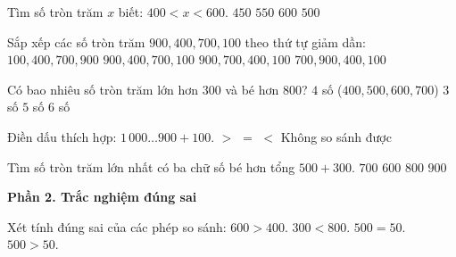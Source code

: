 \begin{ex} %
Tìm số tròn trăm $x$ biết: $400 < x < 600$.
\choice
{$450$}
{$550$}
{$600$}
{\True $500$}
\end{ex}

\begin{ex} %
Sắp xếp các số tròn trăm $900, 400, 700, 100$ theo thứ tự giảm dần:
\choice
{$100, 400, 700, 900$}
{$900, 400, 700, 100$}
{\True $900, 700, 400, 100$}
{$700, 900, 400, 100$}
\end{ex}

\begin{ex} %
Có bao nhiêu số tròn trăm lớn hơn 300 và bé hơn 800?
\choice
{\True $4$ số ($400, 500, 600, 700$)}
{$3$ số}
{$5$ số}
{$6$ số}
\end{ex}

\begin{ex} %
Điền dấu thích hợp: $1\,000 \dots 900 + 100$.
\choice
{$>$}
{\True $=$}
{$<$}
{Không so sánh được}
\end{ex}

\begin{ex} %
Tìm số tròn trăm lớn nhất có ba chữ số bé hơn tổng $500 + 300$.
\choice
{\True $700$}
{$600$}
{$800$}
{$900$}
\end{ex}

\textbf{Phần 2. Trắc nghiệm đúng sai}

\begin{ex} %
Xét tính đúng sai của các phép so sánh:
\choiceTF
{\True $600 > 400$.}
{\True $300 < 800$.}
{$500 = 50$.}
{\True $500 > 50$.}
\end{ex}

